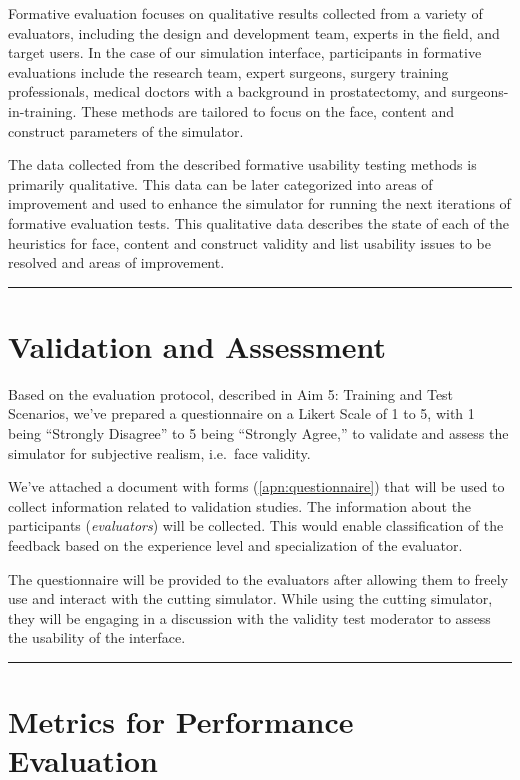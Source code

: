 Formative evaluation focuses on qualitative results collected from a variety of evaluators, including the design and development team, experts in the field, and target users. In the case of our simulation interface, participants in formative evaluations include the research team, expert surgeons, surgery training professionals, medical doctors with a background in prostatectomy, and surgeons-in-training. These methods are tailored to focus on the face, content and construct parameters of the simulator.

The data collected from the described formative usability testing methods is primarily qualitative.  This data can be later categorized into areas of improvement and used to enhance the simulator for running the next iterations of formative evaluation tests. This qualitative data describes the state of each of the heuristics for face, content and construct validity and list usability issues to be resolved and areas of improvement.

\hrule%

\section{Validation and Assessment}

Based on the evaluation protocol, described in Aim 5: Training and Test Scenarios, we've prepared a questionnaire on a Likert Scale of 1 to 5, with 1 being ``Strongly Disagree'' to 5 being ``Strongly Agree,'' to validate and assess the simulator for subjective realism, i.e.\ face validity.

We've attached a document with forms (\autoref{apn:questionnaire}) that will be used to collect information related to validation studies. The information about the participants (\emph{evaluators}) will be collected. This would enable classification of the feedback based on the experience level and specialization of the evaluator.

The questionnaire will be provided to the evaluators after allowing them to freely use and interact with the cutting simulator. While using the cutting simulator, they will be engaging in a discussion with the validity test moderator to assess the usability of the interface.

\hrule%

\section{Metrics for Performance Evaluation}\label{part:}

